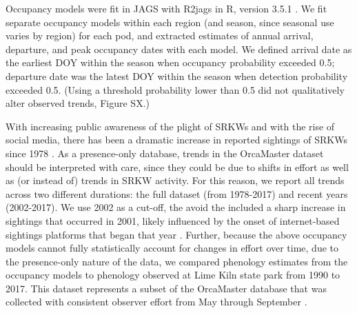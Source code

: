 \documentclass{article}
\begin{document}
\par Occupancy models were fit in JAGS with R2jags \citep{su2015} in R, version 3.5.1 \citep{r2018}. We fit separate occupancy models within each region (and season, since seasonal use varies by region) for each pod, and extracted estimates of annual arrival, departure, and peak occupancy dates with each model. We defined arrival date as the earliest DOY within the season when occupancy probability exceeded 0.5; departure date was the latest DOY within the season when detection probability exceeded 0.5. (Using a threshold probability lower than 0.5 did not qualitatively alter observed trends, Figure SX.)

\par With increasing public awareness of the plight of SRKWs and with the rise of social media, there has been a dramatic increase in reported sightings of SRKWs since 1978 \citep{olson2018}. As a presence-only database, trends in the OrcaMaster dataset should be interpreted with care, since they could be due to shifts in effort as well as (or instead of) trends in SRKW activity. For this reason, we report all trends across two different durations: the full dataset (from 1978-2017) and recent years (2002-2017). We use 2002 as a cut-off, the avoid the included a sharp increase in sightings that occurred in 2001, likely influenced by the onset of internet-based sightings platforms that began that year \citep{olson2018}. Further, because the above occupancy models cannot fully statistically account for changes in effort over time, due to the presence-only nature of the data, we compared phenology estimates from the occupancy models to phenology observed at Lime Kiln state park from 1990 to 2017. This dataset represents a subset of the OrcaMaster database that was collected with consistent observer effort from May through September \citep{olson2018}.  
\end{document}
